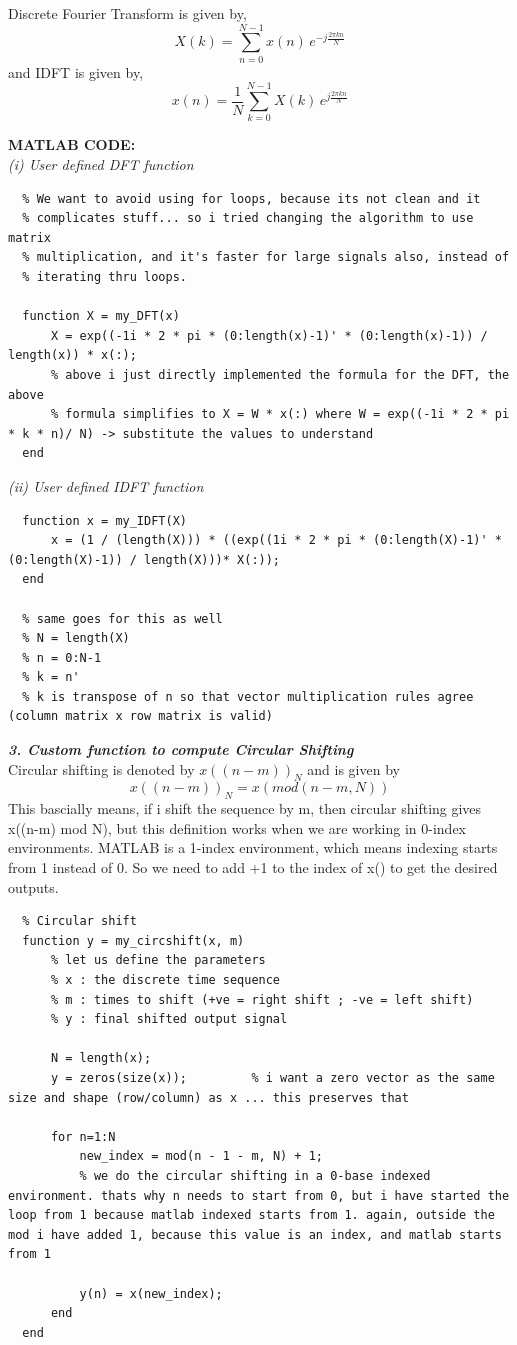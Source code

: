 \documentclass[12pt]{report}
\begin{document}
  Discrete Fourier Transform is given by, \[ X(k) = \sum_{n = 0}^{N-1} x(n) \, e^{-j \frac{2 \pi kn}{N}} \]
  and IDFT is given by, \[ x(n) = \frac{1}{N}\sum_{k=0}^{N-1} X(k) \, e^{j \frac{2 \pi kn}{N}} \]

  \noindent \textbf{MATLAB CODE:} \\

  \textit{(i) User defined DFT function}
  \begin{lstlisting}
  % We want to avoid using for loops, because its not clean and it
  % complicates stuff... so i tried changing the algorithm to use matrix
  % multiplication, and it's faster for large signals also, instead of
  % iterating thru loops.

  function X = my_DFT(x)
      X = exp((-1i * 2 * pi * (0:length(x)-1)' * (0:length(x)-1)) / length(x)) * x(:);
      % above i just directly implemented the formula for the DFT, the above
      % formula simplifies to X = W * x(:) where W = exp((-1i * 2 * pi * k * n)/ N) -> substitute the values to understand
  end
  \end{lstlisting}
  \vspace{0.2cm}

  \textit{(ii) User defined IDFT function}
  \begin{lstlisting}
  function x = my_IDFT(X)
      x = (1 / (length(X))) * ((exp((1i * 2 * pi * (0:length(X)-1)' * (0:length(X)-1)) / length(X)))* X(:));
  end

  % same goes for this as well
  % N = length(X)
  % n = 0:N-1
  % k = n'
  % k is transpose of n so that vector multiplication rules agree (column matrix x row matrix is valid)  
  \end{lstlisting}

  \textbf{\textit{3. Custom function to compute Circular Shifting}} \\
  Circular shifting is denoted by $x((n-m))_{N}$ and is given by \cite{chatgpt} \[ x((n-m))_{N} = x( mod(n-m, N) ) \]
  This bascially means, if i shift the sequence by m, then circular shifting gives x((n-m) mod N), but this definition works when we are working in 0-index environments. MATLAB is a 1-index environment, which means indexing starts from 1 instead of 0. So we need to add +1 to the index of x() to get the desired outputs.
  \begin{lstlisting}
  % Circular shift 
  function y = my_circshift(x, m)
      % let us define the parameters
      % x : the discrete time sequence
      % m : times to shift (+ve = right shift ; -ve = left shift)
      % y : final shifted output signal

      N = length(x);
      y = zeros(size(x));         % i want a zero vector as the same size and shape (row/column) as x ... this preserves that

      for n=1:N
          new_index = mod(n - 1 - m, N) + 1; 
          % we do the circular shifting in a 0-base indexed environment. thats why n needs to start from 0, but i have started the loop from 1 because matlab indexed starts from 1. again, outside the mod i have added 1, because this value is an index, and matlab starts from 1

          y(n) = x(new_index);
      end
  end
  \end{lstlisting}
  
\end{document}
